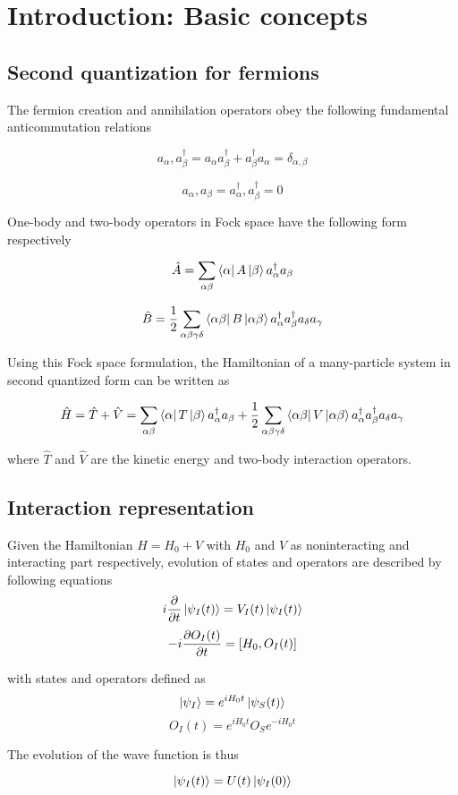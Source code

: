 \section{Introduction: Basic concepts}
\subsection{Second quantization for fermions}
The fermion creation and annihilation operators obey the following fundamental anticommutation relations

\[ {a_\alpha,a_\beta^\dagger} = a_\alpha a_\beta^\dagger + a_\beta^\dagger a_\alpha = \delta_{\alpha,\beta} \]

\[ {a_\alpha,a_\beta} = {a_\alpha^\dagger,a_\beta^\dagger} = 0 \]

One-body and two-body operators in Fock space have the following form respectively

\[ \hat{A} = \sum_{\alpha\beta}\bra{\alpha}A\ket{\beta}a_\alpha^\dagger a_\beta \]

\[ \hat{B} = \frac{1}{2} \sum_{\alpha\beta\gamma\delta}\bra{\alpha\beta}B\ket{\alpha\beta} a_\alpha^\dagger a_\beta^\dagger a_\delta a_\gamma \]

Using this Fock space formulation, the Hamiltonian of a many-particle system in second quantized form can be written as

\[ \hat{H} = \hat{T}+\hat{V} = \sum_{\alpha\beta}\bra{\alpha}T\ket{\beta}a_\alpha^\dagger a_\beta 
    + \frac{1}{2} \sum_{\alpha\beta\gamma\delta}\bra{\alpha\beta}V\ket{\alpha\beta} a_\alpha^\dagger a_\beta^\dagger a_\delta a_\gamma\]

where $\hat{T}$ and $\hat{V}$ are the kinetic energy and two-body interaction operators.

\subsection{Interaction representation}
Given the Hamiltonian $H=H_0+V$ with $H_0$ and $V$ as noninteracting and interacting part respectively,
evolution of states and operators are described by following equations
\[ i\frac{\partial }{\partial t}\ket{\psi_I(t)}=V_I(t)\ket{\psi_I(t)} \]
\[ -i\frac{\partial O_I(t)}{\partial t}=\left[H_0,O_I(t)\right] \]

with states and operators defined as
\[ \ket{\psi_I} = e^{i H_0 t}\ket{\psi_S(t)} \]
\[ O_I(t) = e^{i H_0 t} O_S e^{-i H_0 t} \] 

The evolution of the wave function is thus

\[ \ket{\psi_I(t)} = U(t) \ket{\psi_I(0)} \]

